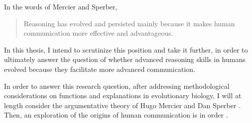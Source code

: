 In the words of Mercier and Sperber,
\begin{quote}
    Reasoning has evolved and persisted mainly because it makes human communication more effective and advantageous.
    \citep[p.~60]{MS11}
\end{quote}


In this thesis, I intend to scrutinize this position and take it further, in order to ultimately
answer the question of whether advanced reasoning skills in humans evolved because they facilitate more advanced communication.

In order to answer this research question, after addressing methodological considerations on functions and explanations in evolutionary biology, I will at length consider the argumentative theory of Hugo Mercier and Dan Sperber \citep{MS11, Mercier16, MS17}. Then, an exploration of the origins of human communication is in order \citep{Tomasello08-origins, Moore17, Scott-Phillips17-pragmatics, Scott-Phillips18-communication, Benitez21}.
